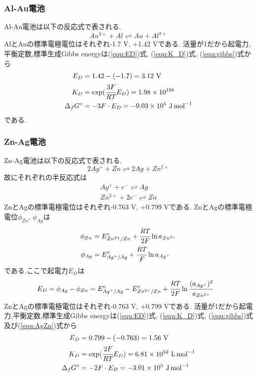 \subsubsection{Al-Au電池}
Al-Au電池は以下の反応式で表される.
\begin{equation*}
  Au^{3+}+Al\rightleftharpoons Au+Al^{3+}
\end{equation*}
AlとAuの標準電極電位はそれぞれ-1.7 \si{\volt}, +1.42 \si{\volt}である.
活量が1だから起電力,平衡定数,標準生成Gibbs energyは(\ref{equ:ED})式, (\ref{equ:K_D})式, (\ref{equ:gibbs})式から
\begin{align*}
  E_D&=1.42-(-1.7)=3.12\ \si{\volt}\\
  K_D&=\exp(\cfrac{3F}{RT}E_D)=1.98\times10^{158}\\
  \Delta_fG^{\circ}&=-3F\cdot E_D=-9.03\times10^5\ \si{\joule.\mole^{-1}}
\end{align*}
である.
\subsubsection{Zn-Ag電池}
Zn-Ag電池は以下の反応式で表される.
\begin{equation}
  2Ag^+ + Zn \rightleftharpoons 2Ag + Zn^{2+}
\end{equation}
故にそれぞれの半反応式は
\begin{align}
  Ag^+ + e^- \rightleftharpoons Ag\\
  Zn^{2+} + 2e^{-} \rightleftharpoons Zn
\end{align}
ZnとAgの標準電極電位はそれぞれ-0.763 \si{\volt}, +0.799 \si{\volt}である.
ZnとAgの標準電極電位$\phi_{Zn}$, $\phi_{Ag}$は
\begin{align}
  \phi_{Zn}&=E^{\circ}_{Zn^{2+}/Zn}+\cfrac{RT}{2F}\ln a_{Zn^{2+}}\\
  \phi_{Ag}&=E^{\circ}_{Ag^{+}/Ag}+\cfrac{RT}{F}\ln a_{Ag^{+}}
\end{align}
である.ここで起電力$E_D$は
\begin{align}
  \label{equ:AgZn}
  E_D&=\phi_{Ag}-\phi_{Zn}=E^{\circ}_{Ag^{+}/Ag}-E^{\circ}_{Zn^{2+}/Zn}+\cfrac{RT}{2F} \ln \cfrac{(a_{Ag^+})^2}{a_{Zn^{2+}}}
\end{align}
ZnとAgの標準電極電位はそれぞれ-0.763 \si{\volt}, +0.799 \si{\volt}である.
活量が1だから起電力,平衡定数,標準生成Gibbs energyは(\ref{equ:ED})式, (\ref{equ:K_D})式, (\ref{equ:gibbs})式及び(\ref{equ:AgZn})式から
\begin{align*}
  E_D&=0.799-(-0.763)=1.56\ \si{\volt}\\
  K_D&=\exp(\cfrac{2F}{RT}E_D)=6.81\times10^{52}\ \si{L.\mole^{-1}}\\
  \Delta_fG^{\circ}&=-2F\cdot E_D=-3.01\times10^5\ \si{\joule.\mole^{-1}}
\end{align*}


